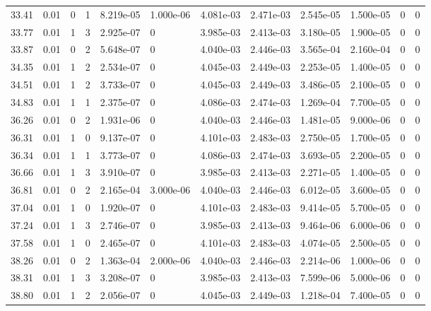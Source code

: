 \documentclass[preview]{standalone}
\begin{document}
{{{\begin{tabular}{L{1.2cm}C{1.2cm} C{0.3cm}C{0.5cm} C{1.4cm}C{1.4cm} C{1.4cm}C{1.4cm} C{1.6cm}C{1.6cm} C{1.6cm}C{1.6cm}}
  33.41  &  0.01  & 0     &  1 &  8.219e-05  & 1.000e-06  &  4.081e-03&   2.471e-03& 2.545e-05 & 1.500e-05   &  0 & 0  \\ 
  33.77  &  0.01  & 1     &  3 &  2.925e-07  & 0  &  3.985e-03&   2.413e-03& 3.180e-05 & 1.900e-05   &  0 & 0  \\ 
  33.87  &  0.01  & 0     &  2 &  5.648e-07  & 0  &  4.040e-03&   2.446e-03& 3.565e-04 & 2.160e-04   &  0 & 0  \\ 
  34.35  &  0.01  & 1     &  2 &  2.534e-07  & 0  &  4.045e-03&   2.449e-03& 2.253e-05 & 1.400e-05   &  0 & 0  \\ 
  34.51  &  0.01  & 1     &  2 &  3.733e-07  & 0  &  4.045e-03&   2.449e-03& 3.486e-05 & 2.100e-05   &  0 & 0  \\ 
  34.83  &  0.01  & 1     &  1 &  2.375e-07  & 0  &  4.086e-03&   2.474e-03& 1.269e-04 & 7.700e-05   &  0 & 0  \\ 
  36.26  &  0.01  & 0     &  2 &  1.931e-06  & 0  &  4.040e-03&   2.446e-03& 1.481e-05 & 9.000e-06   &  0 & 0  \\ 
  36.31  &  0.01  & 1     &  0 &  9.137e-07  & 0  &  4.101e-03&   2.483e-03& 2.750e-05 & 1.700e-05   &  0 & 0  \\ 
  36.34  &  0.01  & 1     &  1 &  3.773e-07  & 0  &  4.086e-03&   2.474e-03& 3.693e-05 & 2.200e-05   &  0 & 0  \\ 
  36.66  &  0.01  & 1     &  3 &  3.910e-07  & 0  &  3.985e-03&   2.413e-03& 2.271e-05 & 1.400e-05   &  0 & 0  \\ 
  36.81  &  0.01  & 0     &  2 &  2.165e-04  & 3.000e-06  &  4.040e-03&   2.446e-03& 6.012e-05 & 3.600e-05   &  0 & 0  \\ 
  37.04  &  0.01  & 1     &  0 &  1.920e-07  & 0  &  4.101e-03&   2.483e-03& 9.414e-05 & 5.700e-05   &  0 & 0  \\ 
  37.24  &  0.01  & 1     &  3 &  2.746e-07  & 0  &  3.985e-03&   2.413e-03& 9.464e-06 & 6.000e-06   &  0 & 0  \\ 
  37.58  &  0.01  & 1     &  0 &  2.465e-07  & 0  &  4.101e-03&   2.483e-03& 4.074e-05 & 2.500e-05   &  0 & 0  \\ 
  38.26  &  0.01  & 0     &  2 &  1.363e-04  & 2.000e-06  &  4.040e-03&   2.446e-03& 2.214e-06 & 1.000e-06   &  0 & 0  \\ 
  38.31  &  0.01  & 1     &  3 &  3.208e-07  & 0  &  3.985e-03&   2.413e-03& 7.599e-06 & 5.000e-06   &  0 & 0  \\ 
  38.80  &  0.01  & 1     &  2 &  2.056e-07  & 0  &  4.045e-03&   2.449e-03& 1.218e-04 & 7.400e-05   &  0 & 0  \\ 

\end{tabular}}}}
\end{document}
